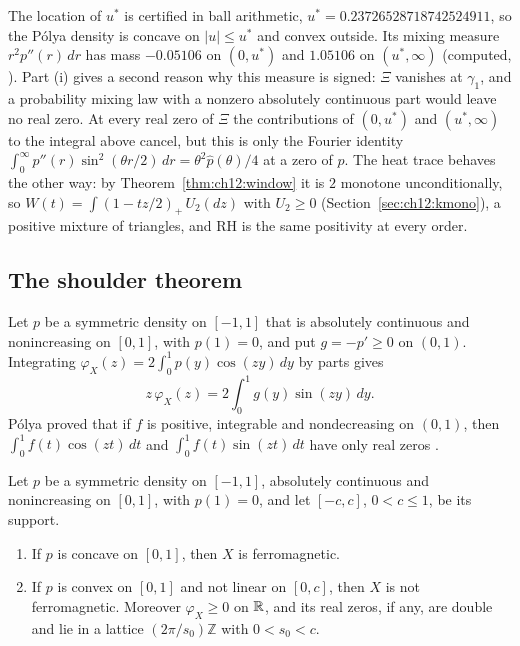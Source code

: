 The location of $u^*$ is certified in ball arithmetic, $u^*=0.23726528718742524911$, so the P\'olya density is concave on $|u|\le u^*$ and convex outside. Its mixing measure $r^2p''(r)\,dr$ has mass $-0.05106$ on $(0,u^*)$ and $1.05106$ on $(u^*,\infty)$ (computed, \cite{P26pg3}). Part (i) gives a second reason why this measure is signed: $\Xi$ vanishes at $\gamma_1$, and a probability mixing law with a nonzero absolutely continuous part would leave no real zero. At every real zero of $\Xi$ the contributions of $(0,u^*)$ and $(u^*,\infty)$ to the integral above cancel, but this is only the Fourier identity $\int_0^\infty p''(r)\sin^2(\theta r/2)\,dr=\theta^2\hat p(\theta)/4$ at a zero of $\hat p$. The heat trace behaves the other way: by Theorem~\ref{thm:ch12:window} it is $2$ monotone unconditionally, so $W(t)=\int(1-tz/2)_+\,U_2(dz)$ with $U_2\ge0$ (Section~\ref{sec:ch12:kmono}), a positive mixture of triangles, and RH is the same positivity at every order.

\subsection{The shoulder theorem}\label{fm:sec:shoulder}

Let $p$ be a symmetric density on $[-1,1]$ that is absolutely continuous and nonincreasing on $[0,1]$, with $p(1)=0$, and put $g=-p'\ge0$ on $(0,1)$. Integrating $\varphi_X(z)=2\int_0^1p(y)\cos(zy)\,dy$ by parts gives
\begin{equation}\label{fm:eq:sine}
z\,\varphi_X(z)=2\int_0^1g(y)\sin(zy)\,dy .
\end{equation}
P\'olya proved that if $f$ is positive, integrable and nondecreasing on $(0,1)$, then $\int_0^1f(t)\cos(zt)\,dt$ and $\int_0^1f(t)\sin(zt)\,dt$ have only real zeros \cite{Polya18}.

\begin{theorem}\label{fm:thm:shoulder}
Let $p$ be a symmetric density on $[-1,1]$, absolutely continuous and nonincreasing on $[0,1]$, with $p(1)=0$, and let $[-c,c]$, $0<c\le1$, be its support.
\begin{enumerate}
\item[(i)] If $p$ is concave on $[0,1]$, then $X$ is ferromagnetic.
\item[(ii)] If $p$ is convex on $[0,1]$ and not linear on $[0,c]$, then $X$ is not ferromagnetic. Moreover $\varphi_X\ge0$ on $\mathbb{R}$, and its real zeros, if any, are double and lie in a lattice $(2\pi/s_0)\mathbb Z$ with $0<s_0<c$.
\end{enumerate}
\end{theorem}

